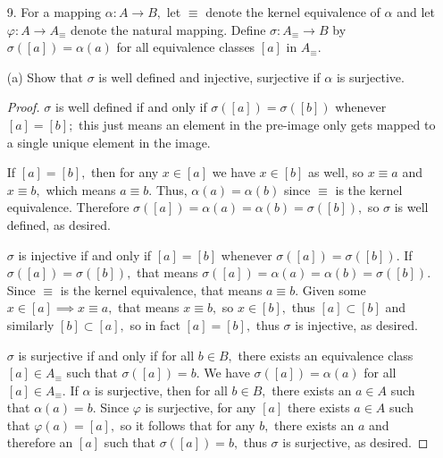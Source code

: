 \documentclass{article}
\begin{document}
\begin{itemize}
		(d) $\alpha\left( \frac{n}{m} \right)=\frac{5m+7n}{3n+m}$
			\begin{soln}
				This is  Similarly to part (b), we wish to show that if $n/m=a/b,$ then $\alpha\left( \frac{n}{m} \right) = \frac{5m+7n}{3n+m} = \frac{5b+7a}{3a+b}=\alpha\left( \frac{a}{b} \right).$ Cross multiplying, this is equivalent to
				\begin{align*}
					(5m+7n)(3a+b) &= (5b+7a)(3n+m) \\
					15am+5bm+21an+7bn &= 15bn+5bm+21an+7am \\
					8am &= 8bn \\
					\frac{a}{b} &= \frac{n}{m}
				\end{align*} which is true, as desired.
			\end{soln}

	\item[9.] For a mapping $\alpha:A\to B,$ let $\equiv$ denote the kernel equivalence of $\alpha$ and let $\varphi:A\to A_{\equiv}$ denote the natural mapping. Define $\sigma:A_{\equiv}\to B$ by $\sigma([a])=\alpha(a)$ for all equivalence classes $[a]$ in $A_\equiv.$
		
		(a) Show that $\sigma$ is well defined and injective, surjective if $\alpha$ is surjective.
		\begin{proof}
			$\sigma$ is well defined if and only if $\sigma([a])=\sigma([b])$ whenever $[a]=[b];$ this just means an element in the pre-image only gets mapped to a single unique element in the image. 

			If $[a]=[b],$ then for any $x\in[a]$ we have $x\in[b]$ as well, so $x\equiv a$ and $x\equiv b,$ which means $a\equiv b.$ Thus, $\alpha(a)=\alpha(b)$ since $\equiv$ is the kernel equivalence. Therefore $\sigma([a])=\alpha(a)=\alpha(b)=\sigma([b]),$ so $\sigma$ is well defined, as desired.

			$\sigma$ is injective if and only if $[a]=[b]$ whenever $\sigma([a])=\sigma([b]).$ If $\sigma([a])=\sigma([b]),$ that means $\sigma([a])=\alpha(a)=\alpha(b)=\sigma([b]).$ Since $\equiv$ is the kernel equivalence, that means $a\equiv b.$ Given some $x\in[a]\implies x\equiv a,$ that means $x\equiv b,$ so $x\in[b],$ thus $[a]\subset[b]$ and similarly $[b]\subset[a],$ so in fact $[a]=[b],$ thus $\sigma$ is injective, as desired.

			$\sigma$ is surjective if and only if for all $b\in B,$ there exists an equivalence class $[a]\in A_\equiv$ such that $\sigma([a])=b.$ We have $\sigma([a])=\alpha(a)$ for all $[a]\in A_\equiv.$ If $\alpha$ is surjective, then for all $b\in B,$ there exists an $a\in A$ such that $\alpha(a)=b.$ Since $\varphi$ is surjective, for any $[a]$ there exists $a\in A$ such that $\varphi(a)=[a],$ so it follows that for any $b,$ there exists an $a$ and therefore an $[a]$ such that $\sigma([a])=b,$ thus $\sigma$ is surjective, as desired. 


\end{proof}
\end{itemize}
\end{document}
